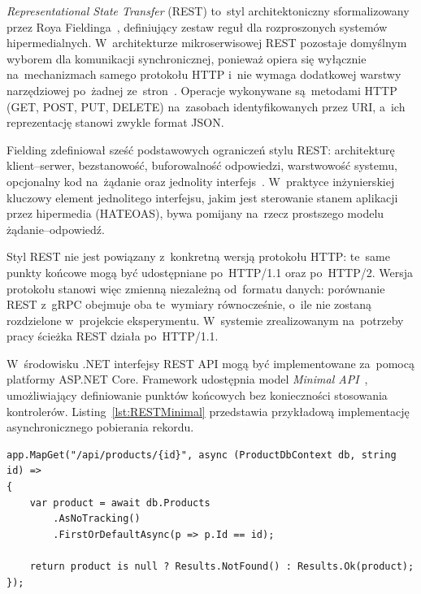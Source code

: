 
\textit{Representational State Transfer} (REST) to~styl architektoniczny sformalizowany przez Roya Fieldinga~\cite{bib:Fielding2000}, definiujący zestaw reguł dla rozproszonych systemów hipermedialnych. W~architekturze mikroserwisowej REST pozostaje domyślnym wyborem dla komunikacji synchronicznej, ponieważ opiera się wyłącznie na~mechanizmach samego protokołu HTTP i~nie wymaga dodatkowej warstwy narzędziowej po~żadnej ze~stron~\cite{bib:Newman2021, bib:Fowler2014}. Operacje wykonywane są~metodami HTTP (GET, POST, PUT, DELETE) na~zasobach identyfikowanych przez URI, a~ich reprezentację stanowi zwykle format JSON.

Fielding zdefiniował sześć podstawowych ograniczeń stylu REST: architekturę klient--serwer, bezstanowość, buforowalność odpowiedzi, warstwowość systemu, opcjonalny kod na~żądanie oraz jednolity interfejs~\cite{bib:Fielding2000}. W~praktyce inżynierskiej kluczowy element jednolitego interfejsu, jakim jest sterowanie stanem aplikacji przez hipermedia (HATEOAS), bywa pomijany na~rzecz prostszego modelu żądanie--odpowiedź.

Styl REST nie jest powiązany z~konkretną wersją protokołu HTTP: te~same punkty końcowe mogą być udostępniane po~HTTP/1.1 oraz po~HTTP/2. Wersja protokołu stanowi więc zmienną niezależną od~formatu danych: porównanie REST z~gRPC obejmuje oba te~wymiary równocześnie, o~ile nie zostaną rozdzielone w~projekcie eksperymentu. W~systemie zrealizowanym na~potrzeby pracy ścieżka REST działa po~HTTP/1.1.

W~środowisku .NET interfejsy REST API mogą być implementowane za~pomocą platformy ASP.NET Core. Framework udostępnia model \textit{Minimal API}~\cite{bib:MinimalApi}, umożliwiający definiowanie punktów końcowych bez konieczności stosowania kontrolerów. Listing~\ref{lst:RESTMinimal} przedstawia przykładową implementację asynchronicznego pobierania rekordu.

\begin{lstlisting}[language={[Sharp]C}, caption={Definicja punktu końcowego REST z~wykorzystaniem Minimal API w~.NET~10}, label=lst:RESTMinimal]
app.MapGet("/api/products/{id}", async (ProductDbContext db, string id) =>
{
    var product = await db.Products
        .AsNoTracking()
        .FirstOrDefaultAsync(p => p.Id == id);
        
    return product is null ? Results.NotFound() : Results.Ok(product);
});
\end{lstlisting}

